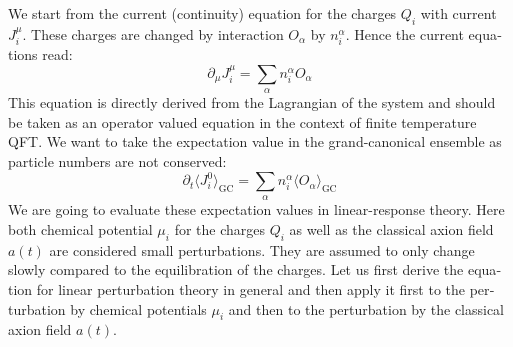 \documentclass[master,       %
               twoside,        %
               BCOR10mm,       %
               english,ngerman, %
               ]{GAUBM}
\begin{document}
\begin{otherlanguage}{english}
We start from the current (continuity) equation for the charges $Q_i$ with current $J_i^\mu$. These charges are changed by interaction $O_\alpha$ by $n_i^\alpha$. Hence the current equations read:
\begin{equation}
	\label{eq:current_eq}
	\partial_\mu J_i^\mu = \sum_\alpha n_i^\alpha O_\alpha
\end{equation}
This equation is directly derived from the Lagrangian of the system and should be taken as an operator valued equation in the context of finite temperature QFT.
We want to take the expectation value in the grand-canonical ensemble as particle numbers are not conserved:
\begin{equation}
	\label{eq:current_eq_expectation_value}
	\partial_t \langle J_i^0 \rangle_{\mathrm{GC}} = \sum_\alpha n_i^\alpha \langle O_\alpha \rangle_{\mathrm{GC}}
\end{equation}
We are going to evaluate these expectation values in linear-response theory.
Here both chemical potential $\mu_i$ for the charges $Q_i$ as well as the classical axion field $a(t)$ are considered small perturbations. They are assumed to only change slowly compared to the equilibration of the charges.
Let us first derive the equation for linear perturbation theory in general and then apply it first to the perturbation by chemical potentials $\mu_i$ and then to the perturbation by the classical axion field $a(t)$.


\end{otherlanguage}
\end{document}
